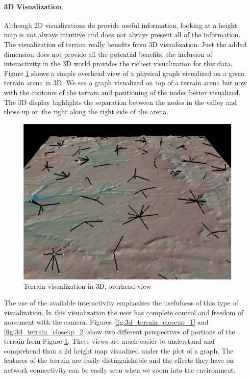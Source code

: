 \paragraph{3D Visualization}
Although 2D visualizations do provide useful information, looking at a height map is not always intuitive and does not always present all of the information.  The visualization of terrain really benefits from 3D visualization.  Just the added dimension does not provide all the potential benefits, the inclusion of interactivity in the 3D world provides the richest visualization for this data.  Figure \ref{fig:3d_terrain_overhead} shows a simple overhead view of a physical graph visualized on a given terrain arena in 3D.  We see a graph visualized on top of a terrain arena but now with the contours of the terrain and positioning of the nodes better visualized.  The 3D display highlights the separation between the nodes in the valley and those up on the right along the right side of the arena.

\begin{figure}[ht]
\centering
  \includegraphics[scale=0.75]{images/network_vis/3D_terrain.eps}
  \caption{Terrain visualization in 3D, overhead view}
\label{fig:3d_terrain_overhead}
\end{figure}

The use of the available interactivity emphasizes the usefulness of this type of visualization.  In this visualization the user has complete control and freedom of movement with the camera.  Figures \ref{fig:3d_terrain_closeup_1} and \ref{fig:3d_terrain_closeup_2} show two different perspectives of portions of the terrain from Figure \ref{fig:3d_terrain_overhead}.  These views are much easier to understand and comprehend than a 2d height map visualized under the plot of a graph.  The features of the terrain are easily distinguishable and the effects they have on network connectivity can be easily seen when we zoom into the environment.

